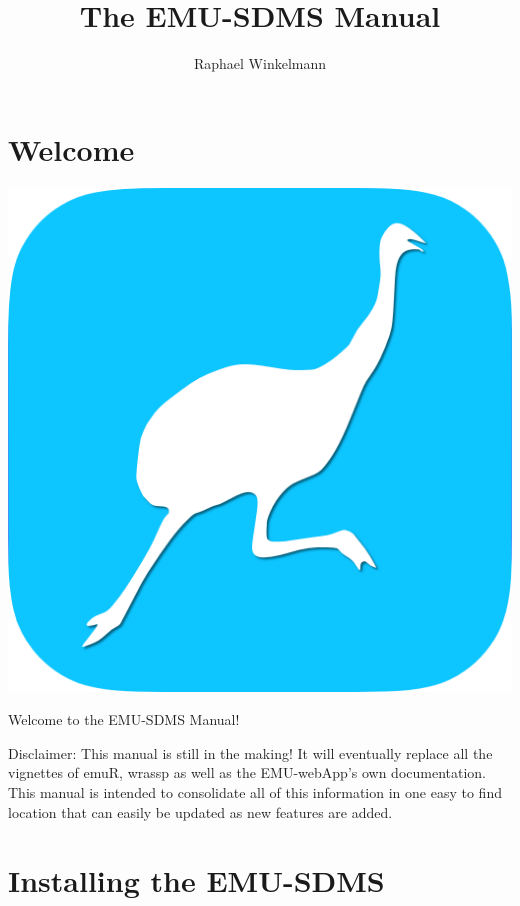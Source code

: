 \documentclass[]{book}
\title{The EMU-SDMS Manual}
\author{Raphael Winkelmann}
\date{}
\theoremstyle{definition}
\theoremstyle{definition}
\theoremstyle{definition}
\theoremstyle{remark}
\begin{document}
\maketitle

{
\setcounter{tocdepth}{1}
\tableofcontents
}
\hypertarget{welcome}{%
\chapter*{Welcome}\label{welcome}}

\begin{center}\includegraphics[width=0.35\linewidth]{pics/EMU-webAppIcon-roundCorners} \end{center}

Welcome to the EMU-SDMS Manual!

{ Disclaimer: This manual is still in the making! It will eventually
replace all the vignettes of emuR, wrassp as well as the EMU-webApp's
own documentation. This manual is intended to consolidate all of this
information in one easy to find location that can easily be updated as
new features are added.}

\hypertarget{installing-the-emu-sdms}{%
\chapter{Installing the EMU-SDMS}\label{installing-the-emu-sdms}}
\end{document}
